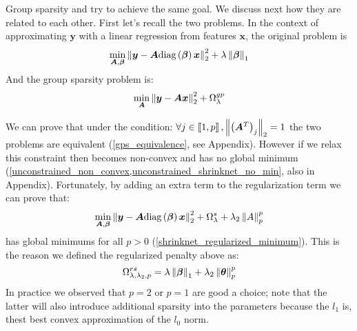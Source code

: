 Group sparsity and \shrink try to achieve the same goal. We discuss next how
they are related to each other. First let's recall the two problems. In the context of approximating $\bm{y}$ with a linear regression from features $\bm{x}$, the
original \shrink problem is 
%
\begin{equation}
  \min_{\bm{A}, \bm{\beta}} \left\lVert\bm{y} - \bm{A}\text{diag}\left(\bm{\beta}\right)\bm{x}\right\rVert_2^2 + \lambda \left\lVert\bm{\beta}\right\rVert_1
\end{equation}
%
And the group sparsity problem is:
%
\begin{equation}
  \min_{\bm{A}} \left\lVert\bm{y} - \bm{A}\bm{x}\right\rVert_2^2 + \Omega_\lambda^{gp}
\end{equation}
%

We can prove that under the condition: $\forall j\in \left\llbracket1, p\right\rrbracket,
\left\lVert\left(\bm{A}^T\right)_j\right\rVert_2 = 1$ the two problems are equivalent
(\cref{gps_equivalence}, see Appendix). However if we relax this constraint then \shrink
becomes non-convex and has no global minimum
(\cref{unconstrained_non_convex,unconstrained_shrinknet_no_min}, also in Appendix). Fortunately,
by adding an extra term to the \shrink regularization term we can prove that:
%
\begin{equation}
  \min_{\bm{A}, \bm{\beta}} \left\lVert\bm{y} - \bm{A}\text{diag}\left(\bm{\beta}\right)\bm{x}\right\rVert_2^2 + \Omega_\lambda^s + \lambda_2\left\lVert A\right\rVert_p^p
\end{equation}
%
has global minimums for all $p>0$ (\cref{shrinknet_regularized_minimum}).
This is the reason we defined the regularized \shrink penalty above as:
%
\begin{equation}
  \Omega_{\lambda, \lambda_2, p}^{rs} = \lambda\left\lVert\bm{\beta}\right\rVert_1 + \lambda_2\left\lVert\bm\theta\right\rVert_p^p
\end{equation}
%
In practice we observed that $p=2$ or $p=1$ are good a choice; note that the latter
will also introduce additional sparsity into the parameters because the $l_1$ is, 
thest best convex approximation of the $l_0$ norm.